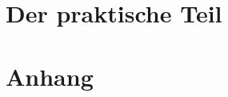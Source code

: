 \documentclass[ oneside,openright,titlepage,numbers=noenddot,%
                headinclude,footinclude,cleardoublepage=empty,abstract=on,
                BCOR=5mm,paper=a4,fontsize=11pt
                ]{report}
\begin{document}
\part{Der praktische Teil}\label{pt:prakticalPart}









\appendix
\cleardoublepage
\part{Anhang}


\setcounter{biburllcpenalty}{7000}
\setcounter{biburlucpenalty}{8000}

\cleardoublepage
\cleardoublepage
\cleardoublepage

\end{document}
